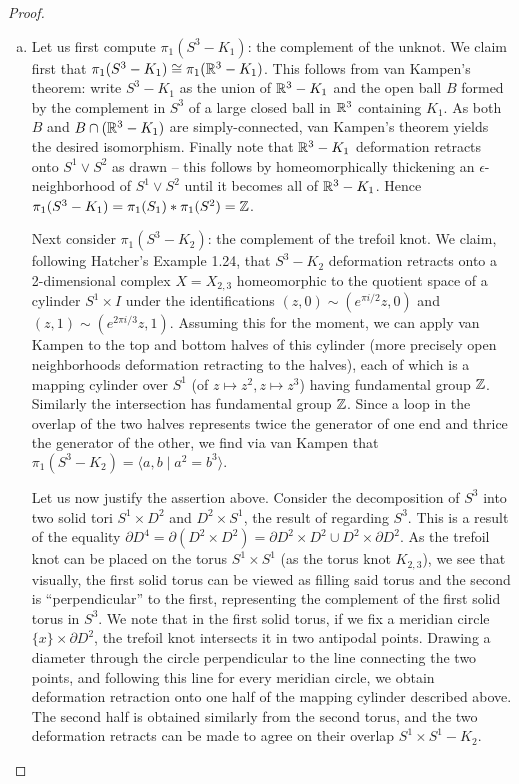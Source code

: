 \documentclass{../mathnotes}
\begin{document}
\begin{proof}
\begin{enumerate}[(a)]
        \item Let us first compute $\pi_1(S^3-K_1)$: the complement of the unknot. We claim first that $\pi_1(S^3-K_1)\cong\pi_1(\mathbb{R}^3-K_1)$.
            This follows from van Kampen's theorem: write $S^3-K_1$ as the union of $\mathbb{R}^3-K_1$ and the open ball $B$
            formed by the complement in $S^3$ of a large closed ball in $\mathbb{R}^3$ containing $K_1$. As both $B$ and
            $B\cap(\mathbb{R}^3-K_1)$ are simply-connected, van Kampen's theorem yields the desired isomorphism. Finally
            note that $\mathbb{R}^3-K_1$ deformation retracts onto $S^1\vee S^2$ as drawn -- this follows by homeomorphically
            thickening an $\epsilon$-neighborhood of $S^1\vee S^2$ until it becomes all of $\mathbb{R}^3-K_1$.
            Hence $\pi_1(S^3-K_1)=\pi_1(S_1)*\pi_1(S^2)=\mathbb{Z}$.

            Next consider $\pi_1(S^3-K_2)$: the complement of the trefoil knot. We claim, following Hatcher's Example 1.24,
            that $S^3-K_2$ deformation retracts onto a 2-dimensional complex $X=X_{2,3}$ homeomorphic to
            the quotient space of a cylinder $S^1\times I$ under the identifications $(z,0)\sim(e^{\pi i/2}z,0)$ and $(z,1)\sim(e^{2\pi i/3}z,1)$.
            Assuming this for the moment, we can apply van Kampen to the top and bottom halves of this cylinder
            (more precisely open neighborhoods deformation retracting to the halves), each of which is a mapping
            cylinder over $S^1$ (of $z\mapsto z^2,z\mapsto z^3$) having fundamental group $\mathbb{Z}$. Similarly the
            intersection has fundamental group $\mathbb{Z}$. Since a loop in the overlap of the two halves represents
            twice the generator of one end and thrice the generator of the other, we find via van Kampen that
            $\pi_1(S^3-K_2)=\langle a,b\mid a^2=b^3\rangle.$
            
            Let us now justify the assertion above. Consider the decomposition of $S^3$ into two solid tori
            $S^1\times D^2$ and $D^2\times S^1$, the result of regarding $S^3$. This is a result of the equality
            $\partial D^4=\partial(D^2\times D^2)=\partial D^2\times D^2\cup D^2\times\partial D^2$.
            As the trefoil knot can be placed on the torus $S^1\times S^1$ (as the torus knot $K_{2,3}$), we see that visually, the first solid
            torus can be viewed as filling said torus and the second is ``perpendicular'' to the first, representing the
            complement of the first solid torus in $S^3$. 
            We note that in the first solid torus, if we fix a meridian circle $\{x\}\times\partial D^2$, the
            trefoil knot intersects it in two antipodal points. Drawing a diameter through the circle perpendicular
            to the line connecting the two points, and following this line for every meridian circle, we obtain
            deformation retraction onto one half of the mapping cylinder described above.
            The second half is obtained similarly from the second torus, and the two deformation retracts can
            be made to agree on their overlap $S^1\times S^1-K_2$.
    \end{enumerate}
\end{proof}
\end{document}
